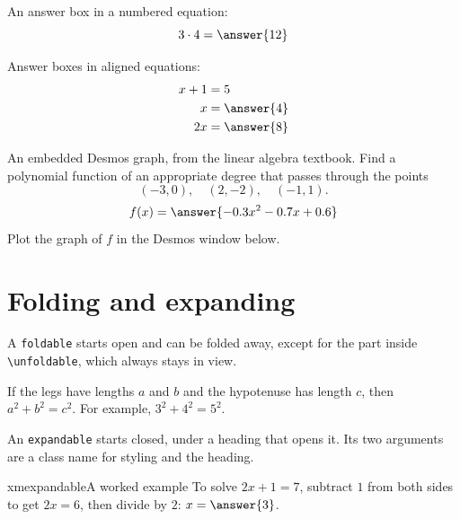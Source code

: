 \documentclass{ximera}
\begin{document}
\begin{problem}
An answer box in a numbered equation:
\begin{equation}
3\cdot 4=\answer{12}
\end{equation}
\end{problem}

\begin{problem}
Answer boxes in aligned equations:
\begin{align*}
x+1&=5 \\
x&=\answer{4} \\
2x&=\answer{8}
\end{align*}
\end{problem}

\begin{problem}
An embedded Desmos graph, from the linear algebra textbook. Find a polynomial
function of an appropriate degree that passes through the points
\[
(-3,0),\quad (2,-2),\quad (-1,1).
\]
\[
f(x)=\answer{-0.3x^2-0.7x+0.6}
\]
Plot the graph of $f$ in the Desmos window below.

\begin{center}
\end{center}
\end{problem}

\section{Folding and expanding}

A \texttt{foldable} starts open and can be folded away, except for the part
inside \verb|\unfoldable|, which always stays in view.

\begin{foldable}
If the legs have lengths $a$ and $b$ and the hypotenuse has length $c$, then
$a^2+b^2=c^2$. For example, $3^2+4^2=5^2$.
\end{foldable}

An \texttt{expandable} starts closed, under a heading that opens it. Its two
arguments are a class name for styling and the heading.

\begin{expandable}{xmexpandable}{A worked example}
To solve $2x+1=7$, subtract $1$ from both sides to get $2x=6$, then divide
by $2$: $x=\answer{3}$.
\end{expandable}
\end{document}
